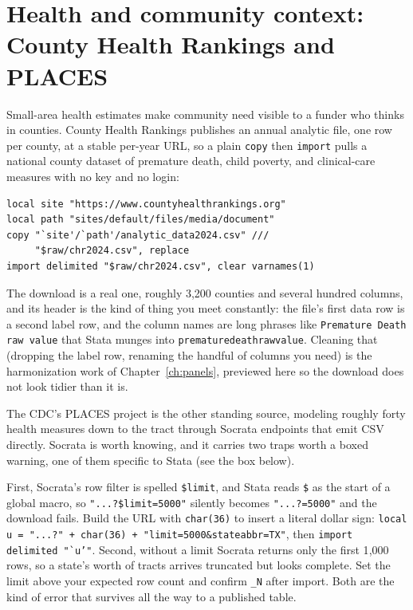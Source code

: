 \documentclass[
    a4paper,
    fontsize=10pt,
    twoside=true,
    numbers=noenddot,
]{kaobook}
\newenvironment{vizcallout}[1][Visualization to build]{%
    \begin{vizbox}[frametitle={#1}]%
}{%
    \end{vizbox}%
}
\begin{document}
\section{Health and community context: County Health Rankings and PLACES}
Small-area health estimates make community need visible to a funder who thinks in counties. County Health Rankings publishes an annual analytic file, one row per county, at a stable per-year URL, so a plain \texttt{copy} then \texttt{import} pulls a national county dataset of premature death, child poverty, and clinical-care measures with no key and no login:
{\footnotesize
\begin{verbatim}
local site "https://www.countyhealthrankings.org"
local path "sites/default/files/media/document"
copy "`site'/`path'/analytic_data2024.csv" ///
     "$raw/chr2024.csv", replace
import delimited "$raw/chr2024.csv", clear varnames(1)
\end{verbatim}
}
The download is a real one, roughly 3{,}200 counties and several hundred columns, and its header is the kind of thing you meet constantly: the file's first data row is a second label row, and the column names are long phrases like \texttt{Premature Death raw value} that Stata munges into \texttt{prematuredeathrawvalue}. Cleaning that (dropping the label row, renaming the handful of columns you need) is the harmonization work of Chapter~\ref{ch:panels}, previewed here so the download does not look tidier than it is.

The CDC's PLACES project is the other standing source, modeling roughly forty health measures down to the tract through Socrata endpoints that emit CSV directly. Socrata is worth knowing, and it carries two traps worth a boxed warning, one of them specific to Stata (see the box below).

\begin{vizcallout}[Two Socrata traps: the \$ collision and silent truncation]
First, Socrata's row filter is spelled \texttt{\$limit}, and Stata reads \texttt{\$} as the start of a global macro, so \texttt{"...?\$limit=5000"} silently becomes \texttt{"...?=5000"} and the download fails. Build the URL with \texttt{char(36)} to insert a literal dollar sign: \texttt{local u = "...?" + char(36) + "limit=5000\&stateabbr=TX"}, then \texttt{import delimited "`u'"}. Second, without a limit Socrata returns only the first 1{,}000 rows, so a state's worth of tracts arrives truncated but looks complete. Set the limit above your expected row count and confirm \texttt{\_N} after import. Both are the kind of error that survives all the way to a published table.
\end{vizcallout}
\end{document}
